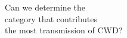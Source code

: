 \documentclass[preview]{standalone}
\begin{document}
\begin{center}
Can we determine the\\category that contributes\\the most transmission of CWD?
\end{center}
\end{document}
